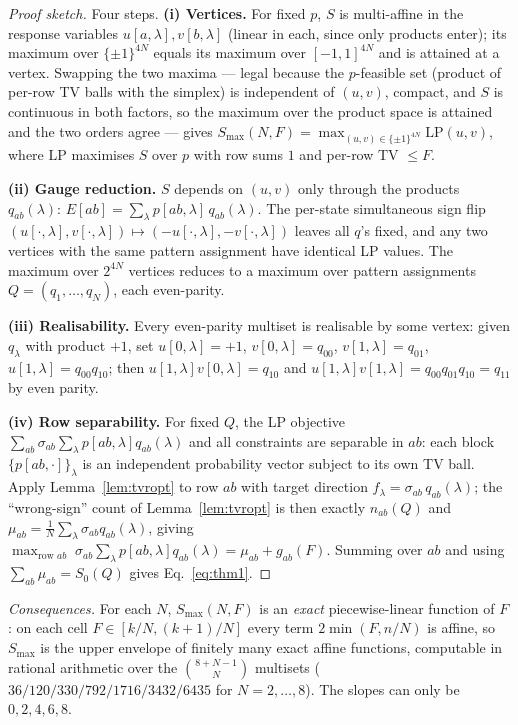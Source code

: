 \documentclass[aps,pra,reprint,superscriptaddress,floatfix]{revtex4-2}
\begin{document}
\begin{proof}[Proof sketch]
Four steps.
\textbf{(i) Vertices.} For fixed $p$, $S$ is multi-affine in the response
variables $u[a,\lambda],v[b,\lambda]$ (linear in each, since only products
enter); its maximum over $\{\pm1\}^{4N}$ equals its maximum over
$[-1,1]^{4N}$ and is attained at a vertex. Swapping the two maxima ---
legal because the $p$-feasible set (product of per-row TV balls with the
simplex) is independent of $(u,v)$, compact, and $S$ is continuous in both
factors, so the maximum over the product space is attained and the two
orders agree --- gives
$S_{\max}(N,F)=\max_{(u,v)\in\{\pm1\}^{4N}} \mathrm{LP}(u,v)$, where
$\mathrm{LP}$ maximises $S$ over $p$ with row sums $1$ and per-row TV $\le F$.

\textbf{(ii) Gauge reduction.} $S$ depends on $(u,v)$ only through the
products $q_{ab}(\lambda)$: $E[ab]=\sum_\lambda p[ab,\lambda]\,q_{ab}(\lambda)$.
The per-state simultaneous sign flip $(u[\cdot,\lambda],v[\cdot,\lambda])\mapsto
(-u[\cdot,\lambda],-v[\cdot,\lambda])$ leaves all $q$'s fixed, and any two
vertices with the same pattern assignment have identical LP values. The
maximum over $2^{4N}$ vertices reduces to a maximum over pattern
assignments $Q=(q_1,\dots,q_N)$, each even-parity.

\textbf{(iii) Realisability.} Every even-parity multiset is realisable by
some vertex: given $q_\lambda$ with product $+1$, set
$u[0,\lambda]=+1$, $v[0,\lambda]=q_{00}$, $v[1,\lambda]=q_{01}$,
$u[1,\lambda]=q_{00}q_{10}$; then $u[1,\lambda]v[0,\lambda]=q_{10}$ and
$u[1,\lambda]v[1,\lambda]=q_{00}q_{01}q_{10}=q_{11}$ by even parity.

\textbf{(iv) Row separability.} For fixed $Q$, the LP objective
$\sum_{ab}\sigma_{ab}\sum_\lambda p[ab,\lambda]q_{ab}(\lambda)$ and all
constraints are separable in $ab$: each block $\{p[ab,\cdot]\}_\lambda$ is an
independent probability vector subject to its own TV ball. Apply
Lemma~\ref{lem:tvropt} to row $ab$ with target direction
$f_\lambda=\sigma_{ab}\,q_{ab}(\lambda)$;
the ``wrong-sign'' count of Lemma~\ref{lem:tvropt} is then exactly $n_{ab}(Q)$ and
$\mu_{ab}=\frac1N\sum_\lambda\sigma_{ab}q_{ab}(\lambda)$, giving
$\max_{\text{row }ab}\;\sigma_{ab}\sum_\lambda p[ab,\lambda]q_{ab}(\lambda)
= \mu_{ab}+g_{ab}(F)$. Summing over $ab$ and using
$\sum_{ab}\mu_{ab}=S_0(Q)$ gives Eq.~\eqref{eq:thm1}.
\end{proof}

\noindent
\emph{Consequences.} For each $N$, $S_{\max}(N,F)$ is an \emph{exact}
piecewise-linear function of $F$: on each cell $F\in[k/N,(k+1)/N]$ every term
$2\min(F,n/N)$ is affine, so $S_{\max}$ is the upper envelope of finitely
many exact affine functions, computable in rational arithmetic over the
$\binom{8+N-1}{N}$ multisets ($36/120/330/792/1716/3432/6435$ for
$N=2,\dots,8$). The slopes can only be $0,2,4,6,8$.
\end{document}
